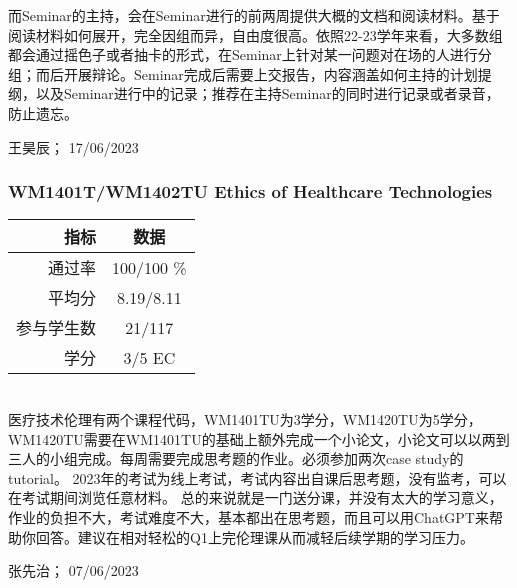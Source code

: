 而Seminar的主持，会在Seminar进行的前两周提供大概的文档和阅读材料。基于阅读材料如何展开，完全因组而异，自由度很高。依照22-23学年来看，大多数组都会通过摇色子或者抽卡的形式，在Seminar上针对某一问题对在场的人进行分组；而后开展辩论。Seminar完成后需要上交报告，内容涵盖如何主持的计划提纲，以及Seminar进行中的记录；推荐在主持Seminar的同时进行记录或者录音，防止遗忘。

\begin{flushright}
王昊辰； 17/06/2023
\end{flushright}

\subsubsection{WM1401T/WM1402TU Ethics of Healthcare Technologies}
\begin{minipage}{0.45\textwidth}
\centering
{}
\end{minipage}%
\begin{minipage}{0.45\textwidth}
\raggedleft
\begin{tabular}{r|c}
\textbf{指标} & \textbf{数据} \\ \hline
通过率 &100/100 \% \\ 
平均分 & 8.19/8.11 \\ 
参与学生数 &21/117 \\
学分 & 3/5 EC\\
\end{tabular}
\end{minipage}\\

医疗技术伦理有两个课程代码，WM1401TU为3学分，WM1420TU为5学分，WM1420TU需要在WM1401TU的基础上额外完成一个小论文，小论文可以以两到三人的小组完成。每周需要完成思考题的作业。必须参加两次case study的tutorial。
2023年的考试为线上考试，考试内容出自课后思考题，没有监考，可以在考试期间浏览任意材料。
总的来说就是一门送分课，并没有太大的学习意义，作业的负担不大，考试难度不大，基本都出在思考题，而且可以用ChatGPT来帮助你回答。建议在相对轻松的Q1上完伦理课从而减轻后续学期的学习压力。

\begin{flushright}
张先治； 07/06/2023
\end{flushright}


